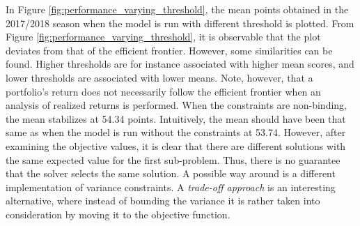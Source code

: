 In Figure \ref{fig:performance_varying_threshold}, the mean points obtained in the 2017/2018 season when the model is run with different threshold is plotted. From Figure \ref{fig:performance_varying_threshold}, it is observable that the plot deviates from that of the efficient frontier. However, some similarities can be found. Higher thresholds are for instance associated with higher mean scores, and lower thresholds are associated with lower means. Note, however, that a portfolio's return does not necessarily follow the efficient frontier when an analysis of realized returns is performed. When the constraints are non-binding, the mean stabilizes at 54.34 points. Intuitively, the mean should have been that same as when the model is run without the constraints at 53.74. However, after examining the objective values, it is clear that there are different solutions with the same expected value for the first sub-problem. Thus, there is no guarantee that the solver selects the same solution. A possible way around is a different implementation of variance constraints. A \textit{trade-off approach} \citep{Speranza} is an interesting alternative, where instead of bounding the variance it is rather taken into consideration by moving it to the objective function.

\newpar

